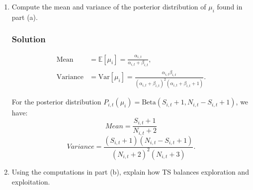 \documentclass{article}
\begin{document}
\begin{enumerate}[label=(\alph*)]
    \item Compute the mean and variance of the posterior distribution of $\mu_i$ found in part (a).
    \subsubsection*{Solution}

    \begin{align*}
    \text{Mean} &= \mathbb{E}[\mu_i] = \frac{\alpha_{i,t}}{\alpha_{i,t} + \beta_{i,t}}, \\
    \text{Variance} &= \text{Var}[\mu_i] = \frac{\alpha_{i,t} \beta_{i,t}}{(\alpha_{i,t} + \beta_{i,t})^2 (\alpha_{i,t} + \beta_{i,t} + 1)}.
    \end{align*}

    For the posterior distribution $P_{i,t}(\mu_i) = \text{Beta}(S_{i,t} + 1, N_{i,t} - S_{i,t} + 1)$, we have:
    \[
    Mean = \frac{S_{i,t} + 1}{N_{i,t} + 2}
    \]
    \[
    Variance = \frac{(S_{i,t} + 1)(N_{i,t} - S_{i,t} + 1)}{(N_{i,t} + 2)^2 (N_{i,t} + 3)}.
    \]

    \item Using the computations in part (b), explain how TS balances exploration and exploitation.

\end{enumerate}
\end{document}
